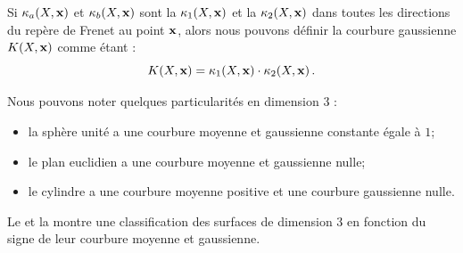 Si $\kappa_{a}(X,\mathbf{x})$ et $\kappa_{b}(X,\mathbf{x})$ sont \respp la  $\kappa_{1}(X,\mathbf{x})$ et la 
$\kappa_{2}(X,\mathbf{x})$ dans toutes les directions du repère de Frenet au point
$\mathbf{x}$, alors nous pouvons définir la courbure gaussienne $K(X,\mathbf{x})$ comme
étant :
%
\begin{equation}
  K(X,\mathbf{x}) = \kappa_{1}(X,\mathbf{x}) \cdot \kappa_{2}(X,\mathbf{x}) \,.
\end{equation}

%
Nous pouvons noter quelques particularités en dimension 3 :
\begin{itemize}
  \item la sphère unité a une courbure moyenne et gaussienne constante égale à $1$;
  \item le plan euclidien a une courbure moyenne et gaussienne nulle;
  \item le cylindre a une courbure moyenne positive et une courbure gaussienne nulle.
\end{itemize}
%
Le  et la
 montre une classification des surfaces de
dimension 3 en fonction du signe de leur courbure moyenne et gaussienne.


